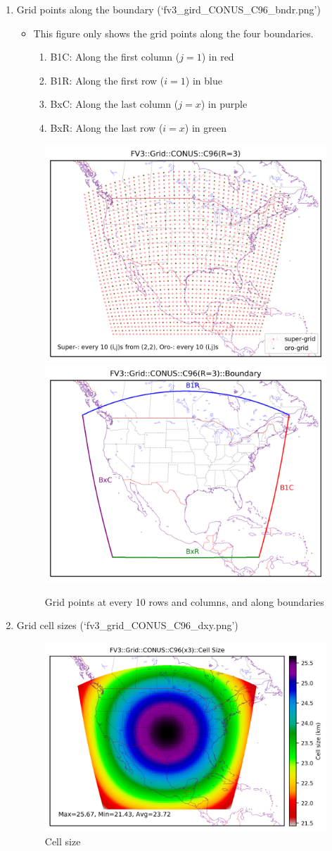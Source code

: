 \documentclass[11pt,fleqn]{report}              %
\begin{document}
\begin{enumerate}
\begin{enumerate}
\item Grid points along the boundary (`fv3\_gird\_CONUS\_C96\_bndr.png')
\begin{itemize}
\item This figure only shows the grid points along the four boundaries.
\begin{enumerate}
\item B1C: Along the first column ($j=1$) in red
\item B1R: Along the first row ($i=1$) in blue
\item BxC: Along the last column ($j=x$) in purple
\item BxR: Along the last row ($i=x$) in green
\end{enumerate}
\end{itemize}

\begin{figure}[ht!]
  \centering
  \includegraphics[width=0.49\linewidth]{fv3_grid_CONUS_C96.png}
  \includegraphics[width=0.49\linewidth]{fv3_grid_CONUS_C96_bndr.png}  
  \caption{Grid points at every 10 rows and columns, and along boundaries}
  \label{fig:py_grid_npts}
\end{figure}

\item Grid cell sizes (`fv3\_grid\_CONUS\_C96\_dxy.png')

\begin{figure}[ht!]
  \centering
  \includegraphics[width=0.65\linewidth]{fv3_grid_CONUS_C96_dxy.png}
  \caption{Cell size}
  \label{fig:py_grid_csize}
\end{figure}



\end{enumerate}
\end{enumerate}
\end{document}
